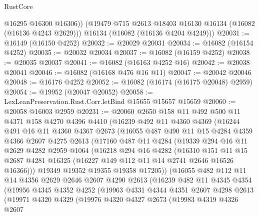 \begin{lexlean}{RustCore}
\begin{coremodule}
          @16295
          @16300
          @16306))
      (@19479 @715 @2613 @18403 @16130 @16134 (@16082 (@16136 @4243 @2629)))
      @16134
      (@16082 (@16136 @4204 @4249)))
@20031 := @16149 (@16150 @4252)
@20032 := @20029 @20031
@20034 := @16082 (@16154 @4252)
@20035 := @20032 @20034
@20037 := @16082 (@16159 @4252)
@20038 := @20035 @20037
@20041 := @16082 (@16163 @4252 @16)
@20042 := @20038 @20041
@20046 := @16082 (@16168 @476 @16 @11)
@20047 := @20042 @20046
@20048 := @16176 @4252
@20052 := @16082 (@16174 (@16175 @20048) @2959)
@20054 := @19952 (@20047 @20052)
@20058 := LexLeanPreservation.Rust.Corr.letBind @15655 @15657 @15659
@20060 := @20058 @16003 @2959
@20231 := @20060
    @2650
    @158
    @11
    @492
    @500
    @11
    @4371
    @158
    @4270
    @4396
    @4410
    (@16239
      @492
      @11
      @4360
      @4369
      (@16244
        @491
        @16
        @11
        @4360
        @4367
        @2673
        (@16055
          @487
          @490
          @11
          @15
          @4284
          @4359
          @4366
          @2607
          @4275
          @2613
          (@17160
            @487
            @11
            @4284
            (@19339
              @294
              @16
              @11
              @2629
              @4282
              @2959
              @1064
              (@16218
                @294
                @16
                @4282
                (@16310
                  @151
                  @11
                  @15
                  @2687
                  @4281
                  @16325
                  (@16227 @149 @112 @11 @14 @2741 @2646 @16526 @16366)))
              @19349
              @19352
              @19355
              @19358
              @17205))
          (@16055
            @482
            @112
            @11
            @14
            @4356
            @2629
            @2646
            @2607
            @4290
            @2613
            (@16239
              @482
              @11
              @4345
              @4354
              (@19956
                @4345
                @4352
                @4252
                (@19963
                  @4331
                  @4344
                  @4351
                  @2607
                  @4298
                  @2613
                  (@19971
                    @4320
                    @4329
                    (@19976
                      @4320
                      @4327
                      @2673
                      (@19983
                        @4319
                        @4326
                        @2607

\end{coremodule}
\end{lexlean}
